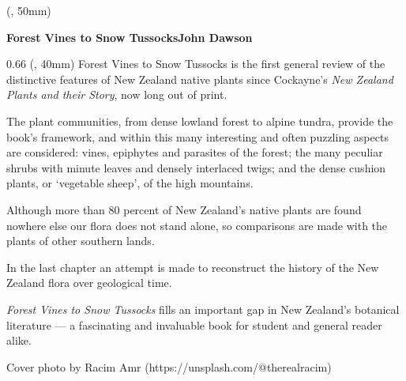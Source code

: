 	\begin{textblock*}{1pt} (\spineoffset-7pt, 50mm)
		\centering%
		\begin{rotate}{-90}
			\fontsize{18}{18}\selectfont%
			\textbf{Forest Vines to Snow Tussocks\hspace{11em}John Dawson}
		\end{rotate}
	\end{textblock*}

	\begin{textblock*}{0.66\coverwidth} (\backcoveroffset, 40mm)
		\Large\centering%
		\setlength{\parskip}{1em}%
		Forest Vines to Snow Tussocks is the first general review of the distinctive features of New Zealand native plants since Cockayne's \emph{New Zealand Plants and their Story}, now long out of print.

		The plant communities, from dense lowland forest to alpine tundra, provide the book's framework, and within this many interesting and often puzzling aspects are considered: vines, epiphytes and parasites of the forest; the many peculiar shrubs with minute leaves and densely interlaced twigs; and the dense cushion plants, or `vegetable sheep', of the high mountains.

		Although more than 80 percent of New Zealand's native plants are found nowhere else our flora does not stand alone, so comparisons are made with the plants of other southern lands.

		In the last chapter an attempt is made to reconstruct the history of the New Zealand flora over geological time.

		\emph{Forest Vines to Snow Tussocks} fills an important gap in New Zealand's botanical literature — a fascinating and invaluable book for student and general reader alike.
		
		\vspace{5em}%
		{\small Cover photo by Racim Amr (https://unsplash.com/@therealracim)}
	\end{textblock*}

	\ISBNgraphic{}


